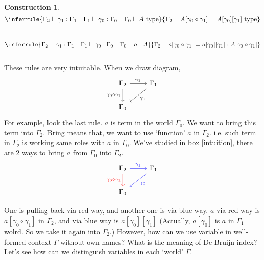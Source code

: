 \documentclass[12pt, letterpaper]{amsart}
\theoremstyle{definition}
\newtheorem{con}[thm]{Construction}
\theoremstyle{remark}
\theoremstyle{plain}
\numberwithin{equation}{section}
\begin{document}
\begin{con}
\\
\[
\inferrule
{\Gamma_2 \vdash \gamma_1 : \Gamma_1 \quad \Gamma_1 \vdash \gamma_0 : \Gamma_0 \quad \Gamma_0 \vdash A \text{ type}}
{\Gamma_2 \vdash A[\gamma_0 \circ \gamma_1] = A[\gamma_0][\gamma_1] \text{ type}}
\]
\\
\[
\inferrule
{\Gamma_2 \vdash \gamma_1 : \Gamma_1 \quad \Gamma_1 \vdash \gamma_0 : \Gamma_0 \quad \Gamma_0 \vdash a : A}
{\Gamma_2 \vdash a[\gamma_0 \circ \gamma_1] = a[\gamma_0][\gamma_1] : A[\gamma_0 \circ \gamma_1]}
\]
\\
These rules are very intuitable. When we draw diagram, 
\[
\begin{tikzcd}
    \Gamma_2 \arrow[d, "\gamma_0 \circ \gamma_1"'] \arrow[r, "\gamma_1"] & \Gamma_1 \arrow[ld, "\gamma_0"] \\
    \Gamma_0
\end{tikzcd}
\]
For example, look the last rule. $a$ is term in the world $\Gamma_0$. We want to 
bring this term into $\Gamma_2$. Bring means that, we want to use \lq function' $a$ in $\Gamma_2$. i.e. such term in $\Gamma_2$ is 
working same roles with $a$ in $\Gamma_0$. We've studied in box \ref{intuition}, there are 2 ways to bring $a$ from $\Gamma_0$ into $\Gamma_2$. 
\[
\begin{tikzcd}
    \Gamma_2 \arrow[d, "\gamma_0 \circ \gamma_1"', red] \arrow[r, "\gamma_1", blue] & \Gamma_1 \arrow[ld, "\gamma_0", blue] \\
    \Gamma_0
\end{tikzcd}
\]
\end{con}
One is pulling back via red way, and another one is via blue way. $a$ via red way is $a[\gamma_0 \circ \gamma_1]$ in $\Gamma_2$, 
and via blue way is $a[\gamma_0][\gamma_1]$ (Actually, $a[\gamma_0]$ is $a$ in $\Gamma_1$ wolrd. So we take it again into $\Gamma_2$.)
However, how can we use variable in well-formed context $\Gamma$ without own names? What is the meaning of De Bruijn index? Let's see how can we distinguish
variables in each \lq world' $\Gamma$. 
\end{document}
